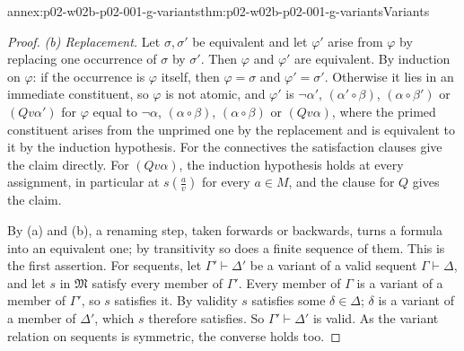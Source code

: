 \begin{annexitem}{annex:p02-w02b-p02-001-g-variants}{thm:p02-w02b-p02-001-g-variants}{Variants}
\begin{proof}
\emph{(b) Replacement.}  Let \(\sigma,\sigma'\) be equivalent and let
\(\varphi'\) arise from \(\varphi\) by replacing one occurrence of
\(\sigma\) by \(\sigma'\).  Then \(\varphi\) and \(\varphi'\) are
equivalent.  By induction on \(\varphi\): if the occurrence is \(\varphi\)
itself, then \(\varphi=\sigma\) and \(\varphi'=\sigma'\).  Otherwise it lies
in an immediate constituent, so \(\varphi\) is not atomic, and \(\varphi'\)
is \(\neg\alpha'\), \((\alpha'\circ\beta)\), \((\alpha\circ\beta')\) or
\((Qv\alpha')\) for \(\varphi\) equal to \(\neg\alpha\),
\((\alpha\circ\beta)\), \((\alpha\circ\beta)\) or \((Qv\alpha)\), where the
primed constituent arises from the unprimed one by the replacement and is
equivalent to it by the induction hypothesis.  For the connectives the
satisfaction clauses give the claim directly.  For \((Qv\alpha)\), the
induction hypothesis holds at every assignment, in particular at
\(s(\tfrac av)\) for every \(a\in M\), and the clause for \(Q\) gives the
claim.

By (a) and (b), a renaming step, taken forwards or backwards, turns a
formula into an equivalent one; by transitivity so does a finite sequence
of them.  This is the first assertion.  For sequents, let
\(\Gamma'\vdash\Delta'\) be a variant of a valid sequent
\(\Gamma\vdash\Delta\), and let \(s\) in \(\mathfrak M\) satisfy every member
of \(\Gamma'\).  Every member of \(\Gamma\) is a variant of a member of
\(\Gamma'\), so \(s\) satisfies it.  By validity \(s\) satisfies some
\(\delta\in\Delta\); \(\delta\) is a variant of a member of \(\Delta'\),
which \(s\) therefore satisfies.  So \(\Gamma'\vdash\Delta'\) is valid.  As
the variant relation on sequents is symmetric, the converse holds too.


\end{proof}
\end{annexitem}
